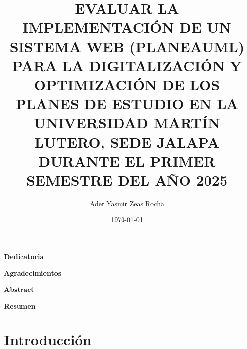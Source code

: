 \documentclass[12pt,letterpaper]{article}
\title{EVALUAR LA IMPLEMENTACIÓN DE UN SISTEMA WEB (PLANEAUML) PARA LA DIGITALIZACIÓN Y OPTIMIZACIÓN DE LOS PLANES DE ESTUDIO EN LA UNIVERSIDAD MARTÍN LUTERO, SEDE JALAPA DURANTE EL PRIMER SEMESTRE DEL AÑO 2025}
\author{Ader Yasmir Zeas Rocha}
\date{\today}
\begin{document}
	
	
	
	
	\clearpage
	\begin{center}\bfseries Dedicatoria \end{center}
	\vspace{1cm} %
	
	\clearpage
	\begin{center}\bfseries Agradecimientos \end{center}
	\vspace{1cm}
	
	\clearpage
	\begin{center}\bfseries Abstract \end{center}
	\vspace{1cm}
	
	\clearpage
	\begin{center}\bfseries Resumen \end{center}
	\vspace{1cm}
	
	\clearpage
	\tableofcontents
	
	\setcounter{section}{0} 
	
	
	\clearpage
	\section{Introducción}
	
	
	\clearpage
\end{document}

